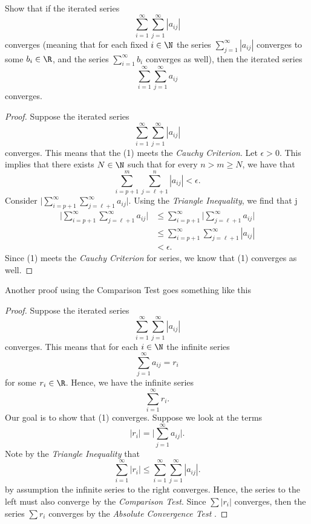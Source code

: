 Show that if the iterated series 
\[ \sum_{i=1}^{\infty} \sum_{j=1}^{\infty} |a_{ij}|\]
converges (meaning that for each fixed \( i \in \N \) the series \( \sum_{j=1}^{\infty} |a_{ij}|\) converges to some \( b_i \in \R \), and the series \( \sum_{i=1}^{\infty} b_i \) converges as well), then the iterated series 
\[ \sum_{i=1}^{\infty} \sum_{j=1}^{\infty} a_{ij}\]
converges.

\begin{proof}
Suppose the iterated series 
\[ \sum_{i=1}^{\infty} \sum_{j=1}^{\infty} |a_{ij}|  \tag{1}\]
converges. This means that the (1) meets the \textit{Cauchy Criterion}. Let \(\epsilon > 0 \). This implies that there exists \( N \in \N \) such that for every \( n > m  \geq N \), we have that 
\[ \sum_{i= p + 1}^{m} \sum_{j= \ell + 1}^{n} |a_{ij}| < \epsilon.\]
Consider \( \Big| \sum_{i=p+1}^{\infty} \sum_{j = \ell + 1 }^{\infty} a_{ij} \Big|\). Using the \textit{Triangle Inequality}, we find that  
j\begin{align*}
    \Big| \sum_{i=p+1}^{\infty} \sum_{j = \ell + 1 }^{\infty} a_{ij} \Big|&\leq \sum_{i=p+1}^{\infty} \Big|\sum_{ j = \ell + 1 }^{\infty} a_{ij} \Big|   \\
                                                                          &\leq \sum_{i = p + 1}^{\infty} \sum_{j = \ell + 1 }^{\infty} |a_{ij}| \\
                                                                          &< \epsilon.
\end{align*}
Since (1) meets the \textit{Cauchy Criterion} for series, we know that (1) converges as well. 
\end{proof}

Another proof using the Comparison Test goes something like this

\begin{proof}
    Suppose the iterated series 
    \[ \sum_{i=1}^{\infty} \sum_{j=1}^{\infty} |a_{ij}| \]
    converges. This means that for each \( i \in \N \) the infinite series 
    \[ \sum_{j=1}^{\infty} a_{ij} = r_i \] for some \( r_i \in \R \). Hence, we have the infinite series 
    \[ \sum_{i=1}^{\infty} r_i. \tag{1} \]
    Our goal is to show that (1) converges. Suppose we look at the terms 
    \[ |r_i| = \Big| \sum_{j=1}^{\infty} a_{ij}\Big|.\]
    Note by the \textit{Triangle Inequality} that 
    \[ \sum_{i=1}^{\infty} |r_i| \leq \sum_{i=1}^{\infty} \sum_{j=1}^{\infty} |a_{ij}|.  \]
    by assumption the infinite series to the right converges. Hence, the series to the left must also converge by the \textit{Comparison Test}. Since \( \sum |r_i|\) converges, then the series 
    \( \sum r_i \) converges by the \textit{ Absolute Convergence Test }. 
\end{proof}

